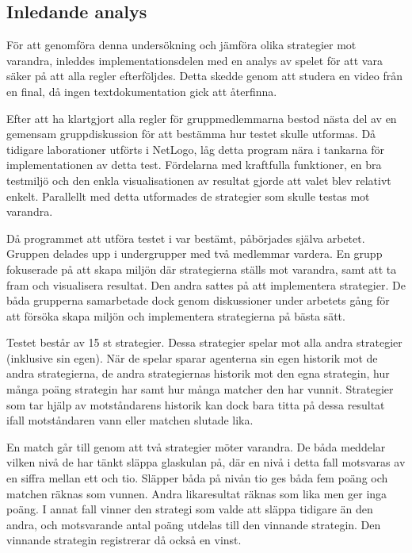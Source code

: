 \subsection{Inledande analys}
För att genomföra denna undersökning och jämföra olika strategier mot varandra, inleddes implementationsdelen med en analys av spelet för att vara säker på att alla regler efterföljdes. Detta skedde genom att studera en video från en final, då ingen textdokumentation gick att återfinna.

Efter att ha klartgjort alla regler för gruppmedlemmarna bestod nästa del av en gemensam gruppdiskussion för att bestämma hur testet skulle utformas. Då tidigare laborationer utförts i NetLogo, låg detta program nära i tankarna för implementationen av detta test. Fördelarna med kraftfulla funktioner, en bra testmiljö och den enkla visualisationen av resultat gjorde att valet blev relativt enkelt. Parallellt med detta utformades de strategier som skulle testas mot varandra. 

Då programmet att utföra testet i var bestämt, påbörjades själva arbetet. Gruppen delades upp i undergrupper med två medlemmar vardera. En grupp fokuserade på att skapa miljön där strategierna ställs mot varandra, samt att ta fram och visualisera resultat. Den andra sattes på att implementera strategier. De båda grupperna samarbetade dock genom diskussioner under arbetets gång för att försöka skapa miljön och implementera strategierna på bästa sätt.

Testet består av 15 st strategier. Dessa strategier spelar mot alla andra strategier (inklusive sin egen). När de spelar sparar agenterna sin egen historik mot de andra strategierna, de andra strategiernas historik mot den egna strategin, hur många poäng strategin har samt hur många matcher den har vunnit. Strategier som tar hjälp av motståndarens historik kan dock bara titta på dessa resultat ifall motståndaren vann eller matchen slutade lika.

En match går till genom att två strategier möter varandra. De båda meddelar vilken nivå de har tänkt släppa glaskulan på, där en nivå i detta fall motsvaras av en siffra mellan ett och tio. Släpper båda på nivån tio ges båda fem poäng och matchen räknas som vunnen. Andra likaresultat räknas som lika men ger inga poäng. I annat fall vinner den strategi som valde att släppa tidigare än den andra, och motsvarande antal poäng utdelas till den vinnande strategin. Den vinnande strategin registrerar då också en vinst.

